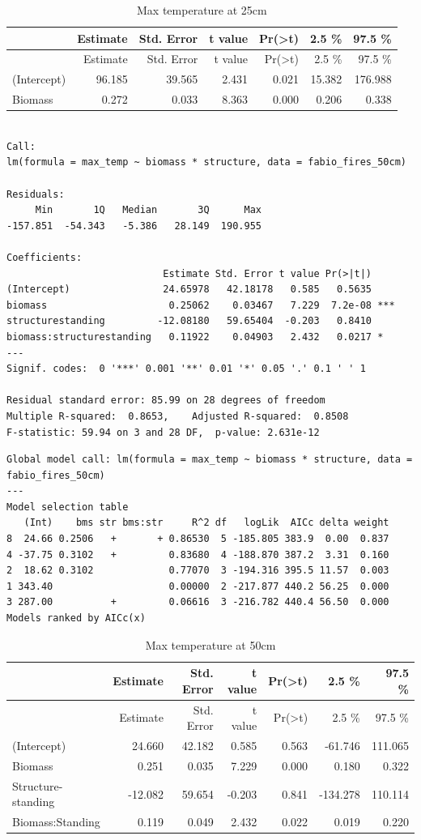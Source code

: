 \documentclass[11pt,a4paper]{article}
\begin{document}
\begin{longtable}[]{@{}lrrrrrr@{}}
\caption{Max temperature at 25cm}\tabularnewline
\toprule
& Estimate & Std. Error & t value &
Pr(\textgreater{}\textbar{}t\textbar{}) & 2.5 \% & 97.5
\%\tabularnewline
\midrule
\endfirsthead
\toprule
& Estimate & Std. Error & t value &
Pr(\textgreater{}\textbar{}t\textbar{}) & 2.5 \% & 97.5
\%\tabularnewline
\midrule
\endhead
(Intercept) & 96.185 & 39.565 & 2.431 & 0.021 & 15.382 &
176.988\tabularnewline
Biomass & 0.272 & 0.033 & 8.363 & 0.000 & 0.206 & 0.338\tabularnewline
\bottomrule
\end{longtable}

\begin{verbatim}

Call:
lm(formula = max_temp ~ biomass * structure, data = fabio_fires_50cm)

Residuals:
     Min       1Q   Median       3Q      Max 
-157.851  -54.343   -5.386   28.149  190.955 

Coefficients:
                           Estimate Std. Error t value Pr(>|t|)    
(Intercept)                24.65978   42.18178   0.585   0.5635    
biomass                     0.25062    0.03467   7.229  7.2e-08 ***
structurestanding         -12.08180   59.65404  -0.203   0.8410    
biomass:structurestanding   0.11922    0.04903   2.432   0.0217 *  
---
Signif. codes:  0 '***' 0.001 '**' 0.01 '*' 0.05 '.' 0.1 ' ' 1

Residual standard error: 85.99 on 28 degrees of freedom
Multiple R-squared:  0.8653,    Adjusted R-squared:  0.8508 
F-statistic: 59.94 on 3 and 28 DF,  p-value: 2.631e-12
\end{verbatim}

\begin{verbatim}
Global model call: lm(formula = max_temp ~ biomass * structure, data = fabio_fires_50cm)
---
Model selection table 
   (Int)    bms str bms:str     R^2 df   logLik  AICc delta weight
8  24.66 0.2506   +       + 0.86530  5 -185.805 383.9  0.00  0.837
4 -37.75 0.3102   +         0.83680  4 -188.870 387.2  3.31  0.160
2  18.62 0.3102             0.77070  3 -194.316 395.5 11.57  0.003
1 343.40                    0.00000  2 -217.877 440.2 56.25  0.000
3 287.00          +         0.06616  3 -216.782 440.4 56.50  0.000
Models ranked by AICc(x) 
\end{verbatim}

\begin{longtable}[]{@{}lrrrrrr@{}}
\caption{Max temperature at 50cm}\tabularnewline
\toprule
& Estimate & Std. Error & t value &
Pr(\textgreater{}\textbar{}t\textbar{}) & 2.5 \% & 97.5
\%\tabularnewline
\midrule
\endfirsthead
\toprule
& Estimate & Std. Error & t value &
Pr(\textgreater{}\textbar{}t\textbar{}) & 2.5 \% & 97.5
\%\tabularnewline
\midrule
\endhead
(Intercept) & 24.660 & 42.182 & 0.585 & 0.563 & -61.746 &
111.065\tabularnewline
Biomass & 0.251 & 0.035 & 7.229 & 0.000 & 0.180 & 0.322\tabularnewline
Structure-standing & -12.082 & 59.654 & -0.203 & 0.841 & -134.278 &
110.114\tabularnewline
Biomass:Standing & 0.119 & 0.049 & 2.432 & 0.022 & 0.019 &
0.220\tabularnewline
\bottomrule
\end{longtable}
\end{document}
